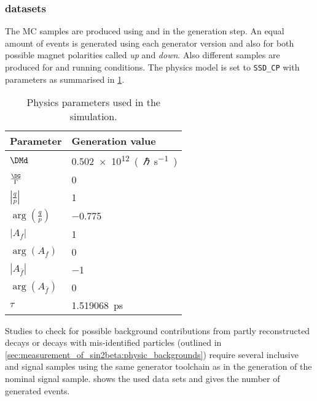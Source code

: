 \subsubsection{\MC datasets}
\label{sec:measurement_of_sin2beta:data_preparation:datasamples:mc}

The \acf{MC} samples are produced using \PythiaSix and \PythiaEight in the
generation step. An equal amount of events is generated using each generator
version and also for both possible magnet polarities called \emph{up} and
\emph{down}. Also different samples are produced for \catOO and \catOT running
conditions. The \EvtGen physics model is set to \Verb=SSD_CP= with
parameters as summarised in
\cref{tab:measurement_of_sin2beta:data_preparation:datasamples:mc:decfile}.
%
\begin{table}
\centering
\caption{Physics parameters used in the simulation.}
\label{tab:measurement_of_sin2beta:data_preparation:datasamples:mc:decfile}
\begin{tabular}{ll}
\toprule
Parameter                            & Generation value \\
\midrule
$\DMd$                               & \SI{0.502e12}{(\planckbar\per\second)} \\
$\frac{\DG}{\Gamma}$                 & \num{0} \\
$\left\vert\frac{q}{p}\right\vert$   & \num{1} \\
$\arg(\frac{q}{p})$                  & \num{-0.775} \\
$\vert A_f \vert$                    & \num{1} \\
$\arg(A_f)$                          & \num{0} \\
$\left\vert A_{\bar{f}} \right\vert$ & \num{-1}  \\
$\arg(A_{\bar{f}})$                  & \num{0} \\
$\tau$                               & \SI{1.519068}{\pico\second}\\
\bottomrule
\end{tabular}
\end{table}
%
Studies to check for possible background contributions from partly reconstructed
decays or decays with mis-identified particles (outlined in
\cref{sec:measurement_of_sin2beta:physic_backgrounds}) require several inclusive
and signal \MC samples using the same generator toolchain as in the generation
of the nominal signal \MC sample.
 shows
the used \MC data sets and gives the number of generated events.

